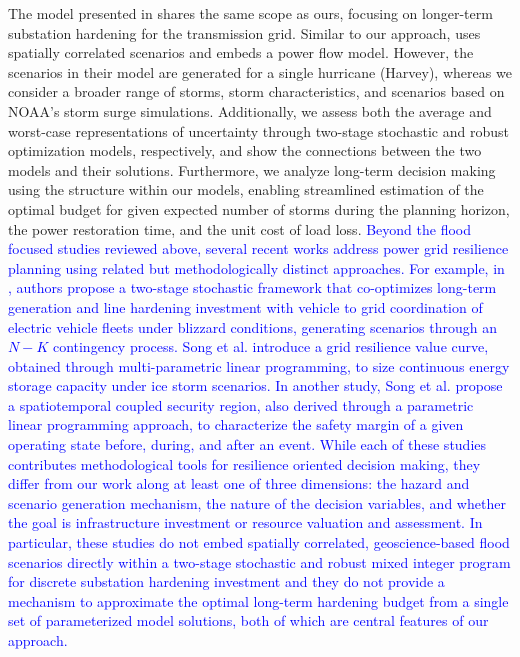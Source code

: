\documentclass[authoryear,preprint,review,12pt]{elsarticle}\usepackage{amssymb}
\begin{document}
The model presented in \cite{SOUTO2022107545} shares the same scope as ours, focusing on longer-term substation hardening for the transmission grid. Similar to our approach, \cite{SOUTO2022107545} uses spatially correlated scenarios and embeds a power flow model. However, the scenarios in their model are generated for a single hurricane (Harvey), whereas we consider a broader range of storms, storm characteristics, and scenarios based on NOAA's storm surge simulations. Additionally, we assess both the average and worst-case representations of uncertainty through two-stage stochastic and robust optimization models, respectively, and show the connections between the two models and their solutions. Furthermore, we analyze long-term decision making using the structure within our models, enabling streamlined estimation of the optimal budget for given expected number of storms during the planning horizon, the power restoration time, and the unit cost of load loss. \textcolor{blue}{Beyond the flood focused studies reviewed above, several recent works address power grid resilience planning using related but methodologically distinct approaches. For example, in \cite{WANG2025111202}, authors propose a two-stage stochastic framework that co-optimizes long-term generation and line hardening investment with vehicle to grid coordination of electric vehicle fleets under blizzard conditions, generating scenarios through an $N - K$ contingency process. Song et al. \cite{SONG11523060} introduce a grid resilience value curve, obtained through multi-parametric linear programming, to size continuous energy storage capacity under ice storm scenarios. In another study, Song et al. \cite{SONG11006430} propose a spatiotemporal coupled security region, also derived through a parametric linear programming approach, to characterize the safety margin of a given operating state before, during, and after an event. While each of these studies contributes methodological tools for resilience oriented decision making, they differ from our work along at least one of three dimensions: the hazard and scenario generation mechanism, the nature of the decision variables, and whether the goal is infrastructure investment or resource valuation and assessment. In particular, these studies do not embed spatially correlated, geoscience-based flood scenarios directly within a two-stage stochastic and robust mixed integer program for discrete substation hardening investment and they do not provide a mechanism to approximate the optimal long-term hardening budget from a single set of parameterized model solutions, both of which are central features of our approach.}
\end{document}
